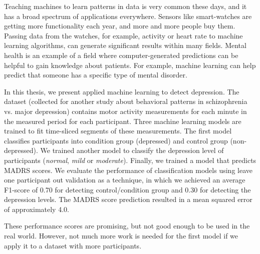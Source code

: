 Teaching machines to learn patterns in data is very common these days, and it has a broad spectrum of applications everywhere. Sensors like smart-watches are getting more functionality each year, and more and more people buy them. Passing data from the watches, for example, activity or heart rate to machine learning algorithms, can generate significant results within many fields. Mental health is an example of a field where computer-generated predictions can be helpful to gain knowledge about patients. For example, machine learning can help predict that someone has a specific type of mental disorder.

In this thesis, we present applied machine learning to detect depression. The dataset (collected for another study about behavioral patterns in schizophrenia vs. major depression) contains motor activity measurements for each minute in the measured period for each participant. Three machine learning models are trained to fit time-sliced segments of these measurements. The first model classifies participants into  condition group (depressed) and control group (non-depressed). We trained another model to classify the depression level of participants (\emph{normal}, \emph{mild} or \emph{moderate}). Finally, we trained a model that predicts MADRS scores. We evaluate the performance of classification models using leave one participant out validation as a technique, in which we achieved an average F1-score of 0.70 for detecting control/condition group and 0.30 for detecting the depression levels. The MADRS score prediction resulted in a mean squared error of approximately 4.0. 

These performance scores are promising, but not good enough to be used in the real world. However, not much more work is needed for the first model if we apply it to a dataset with more participants.